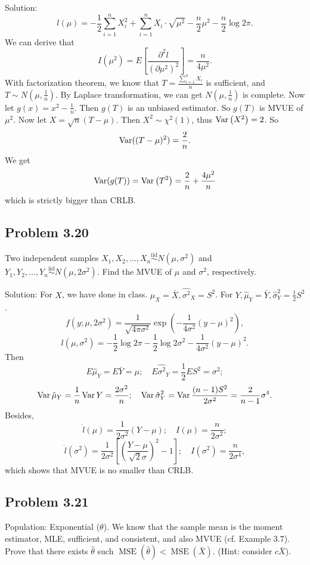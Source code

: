 {Solution:}
\[
l(\mu)=-\frac{1}{2}\sum_{i=1}^{n}X_{i}^{2}+\sum_{i=1}^{n}X_{i}\cdot\sqrt{\mu^{2}}-\frac{n}{2}\mu^{2}-\frac{n}{2}\log 2\pi.
\]
We can derive that
\[
I\left(\mu^{2}\right)=E\left[\frac{\partial^{2}l}{(\partial\mu^{2})^{2}}\right]=\frac{n}{4\mu^{2}}.
\]
With factorization theorem, we know that $T=\frac{\sum_{i=1}^{n}X_{i}}{n}$ is sufficient, and $T\sim N\left(\mu,\frac{1}{n}\right)$. By Laplace transformation, we can get $N\left(\mu,\frac{1}{n}\right)$ is complete. Now let $g(x)=x^{2}-\frac{1}{n}$. Then $g(T)$ is an unbiased estimator. So $g(T)$ is MVUE of $\mu^{2}$. Now let $X=\sqrt{n}(T-\mu)$. Then $X^{2}\sim\chi^{2}(1)$, thus $\operatorname{Var}\left(X^{2}\right)=2$. So
\[
\operatorname{Var}((T-\mu)^{2})=\frac{2}{n}.
\]
We get
\[
\operatorname{Var}(g(T))=\operatorname{Var}\left(T^{2}\right)=\frac{2}{n}+\frac{4\mu^{2}}{n}
\]
which is strictly bigger than CRLB.

\subsection*{Problem 3.20}
Two independent samples $X_{1},X_{2},\ldots,X_{n}\overset{\text{iid}}{\sim}N\left(\mu,\sigma^{2}\right)$ and $Y_{1},Y_{2},\ldots,Y_{n}\overset{\text{iid}}{\sim}N\left(\mu,2\sigma^{2}\right)$. Find the MVUE of $\mu$ and $\sigma^{2}$, respectively.

{Solution:}
For $X$, we have done in class. $\hat{\mu}_{X}=\bar{X},\hat{\sigma^{2}}_{X}=S^{2}$. For $Y,\hat{\mu}_{Y}=\bar{Y},\hat{\sigma}^{2}_{Y}=\frac{1}{2}S^{2}$.
\[
f\left(y;\mu,2\sigma^{2}\right)=\frac{1}{\sqrt{4\pi\sigma^{2}}}\exp\left(-\frac{1}{4\sigma^{2}}(y-\mu)^{2}\right),
\]
\[
l\left(\mu,\sigma^{2}\right)=-\frac{1}{2}\log 2\pi-\frac{1}{2}\log 2\sigma^{2}-\frac{1}{4\sigma^{2}}(y-\mu)^{2}.
\]
Then
\[
E\hat{\mu}_{Y}=E\bar{Y}=\mu;\quad E\hat{\sigma^{2}}_{Y}=\frac{1}{2}ES^{2}=\sigma^{2};
\]
\[
\operatorname{Var}\hat{\mu}_{Y}=\frac{1}{n}\operatorname{Var} Y=\frac{2\sigma^{2}}{n};\quad \operatorname{Var}\hat{\sigma}^{2}_{Y}=\operatorname{Var}\frac{(n-1)S^{2}}{2\sigma^{2}}=\frac{2}{n-1}\sigma^{4}.
\]
Besides,
\[
\dot{l}(\mu)=\frac{1}{2\sigma^{2}}(Y-\mu);\quad I(\mu)=\frac{n}{2\sigma^{2}};
\]
\[
\dot{l}(\sigma^{2})=\frac{1}{2\sigma^{2}}[(\frac{Y-\mu}{\sqrt{2}\sigma})^{2}-1];\quad I(\sigma^{2})=\frac{n}{2\sigma^{4}},
\]
which shows that MVUE is no smaller than CRLB.

\subsection*{Problem 3.21}
Population: Exponential ($\theta$). We know that the sample mean is the moment estimator, MLE, sufficient, and consistent, and also MVUE (cf. Example 3.7). Prove that there exists $\hat{\theta}$ such $\operatorname{MSE}(\hat{\theta})<\operatorname{MSE}(\bar{X})$. (Hint: consider $c\bar{X}$).

